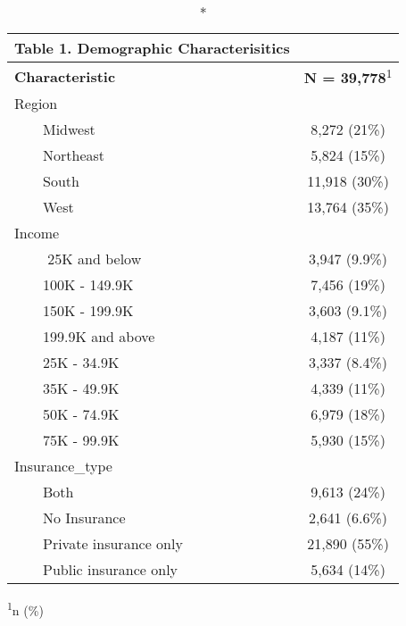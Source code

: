 \documentclass[
  12pt,
]{article}
\begin{document}
\setlength{\LTpost}{0mm}
\begin{longtable}{lc}
\caption*{
{\large Table 1. Demographic Characterisitics}
} \\ 
\toprule
\textbf{Characteristic} & \textbf{N = 39,778}\textsuperscript{1} \\ 
\midrule
Region &  \\ 
    Midwest & 8,272 (21\%) \\ 
    Northeast & 5,824 (15\%) \\ 
    South & 11,918 (30\%) \\ 
    West & 13,764 (35\%) \\ 
Income &  \\ 
     25K and below & 3,947 (9.9\%) \\ 
    100K - 149.9K & 7,456 (19\%) \\ 
    150K - 199.9K & 3,603 (9.1\%) \\ 
    199.9K and above & 4,187 (11\%) \\ 
    25K - 34.9K & 3,337 (8.4\%) \\ 
    35K - 49.9K & 4,339 (11\%) \\ 
    50K - 74.9K & 6,979 (18\%) \\ 
    75K - 99.9K & 5,930 (15\%) \\ 
Insurance\_type &  \\ 
    Both & 9,613 (24\%) \\ 
    No Insurance & 2,641 (6.6\%) \\ 
    Private insurance only & 21,890 (55\%) \\ 
    Public insurance only & 5,634 (14\%) \\ 
\bottomrule
\end{longtable}
\begin{minipage}{\linewidth}
\textsuperscript{1}n (\%)\\
\end{minipage}
\end{document}
